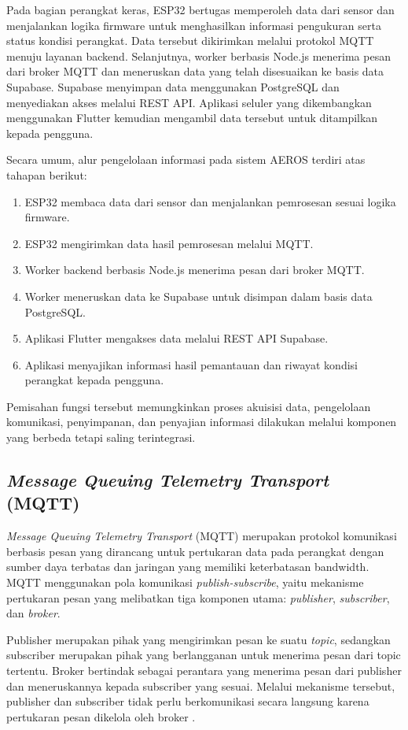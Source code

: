Pada bagian perangkat keras, ESP32 bertugas memperoleh data dari sensor dan menjalankan logika firmware untuk menghasilkan informasi pengukuran serta status kondisi perangkat. Data tersebut dikirimkan melalui protokol MQTT menuju layanan backend. Selanjutnya, worker berbasis Node.js menerima pesan dari broker MQTT dan meneruskan data yang telah disesuaikan ke basis data Supabase. Supabase menyimpan data menggunakan PostgreSQL dan menyediakan akses melalui REST API. Aplikasi seluler yang dikembangkan menggunakan Flutter kemudian mengambil data tersebut untuk ditampilkan kepada pengguna.

Secara umum, alur pengelolaan informasi pada sistem AEROS terdiri atas tahapan berikut:
\begin{enumerate}
    \item ESP32 membaca data dari sensor dan menjalankan pemrosesan sesuai logika firmware.
    \item ESP32 mengirimkan data hasil pemrosesan melalui MQTT.
    \item Worker backend berbasis Node.js menerima pesan dari broker MQTT.
    \item Worker meneruskan data ke Supabase untuk disimpan dalam basis data PostgreSQL.
    \item Aplikasi Flutter mengakses data melalui REST API Supabase.
    \item Aplikasi menyajikan informasi hasil pemantauan dan riwayat kondisi perangkat kepada pengguna.
\end{enumerate}

Pemisahan fungsi tersebut memungkinkan proses akuisisi data, pengelolaan komunikasi, penyimpanan, dan penyajian informasi dilakukan melalui komponen yang berbeda tetapi saling terintegrasi.

\subsection{\textit{Message Queuing Telemetry Transport} (MQTT)}
\label{subsec:MQTT}

\textit{Message Queuing Telemetry Transport} (MQTT) merupakan protokol komunikasi berbasis pesan yang dirancang untuk pertukaran data pada perangkat dengan sumber daya terbatas dan jaringan yang memiliki keterbatasan bandwidth. MQTT menggunakan pola komunikasi \textit{publish-subscribe}, yaitu mekanisme pertukaran pesan yang melibatkan tiga komponen utama: \textit{publisher}, \textit{subscriber}, dan \textit{broker}.

Publisher merupakan pihak yang mengirimkan pesan ke suatu \textit{topic}, sedangkan subscriber merupakan pihak yang berlangganan untuk menerima pesan dari topic tertentu. Broker bertindak sebagai perantara yang menerima pesan dari publisher dan meneruskannya kepada subscriber yang sesuai. Melalui mekanisme tersebut, publisher dan subscriber tidak perlu berkomunikasi secara langsung karena pertukaran pesan dikelola oleh broker \cite{oasis_mqtt}.

